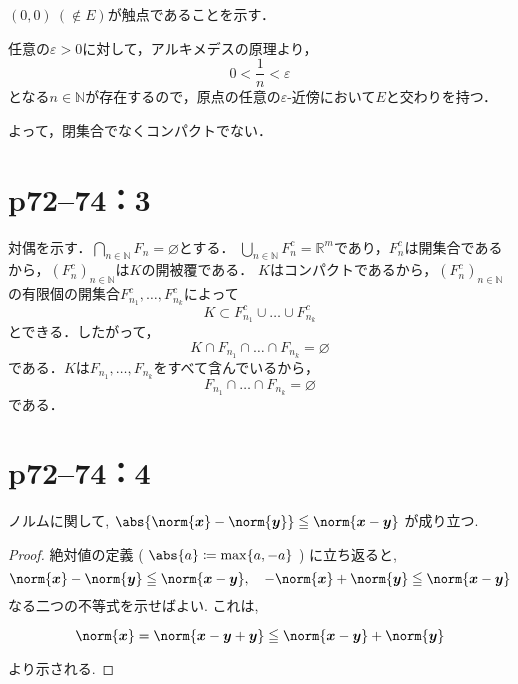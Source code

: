 \begin{tanswer}
    $(0,0)~(\notin E)$が触点であることを示す．

    任意の$\varepsilon >0$に対して，アルキメデスの原理より，
    \[
        0 < \frac{1}{n} < \varepsilon
    \]
    となる$n \in \mathbb{N}$が存在するので，原点の任意の$\varepsilon$-近傍において$E$と交わりを持つ．

    よって，閉集合でなくコンパクトでない．
\end{tanswer}



\section*{p72--74：3}
\begin{tproof}
    対偶を示す．$\bigcap_{n \in \mathbb{N}}F_n = \varnothing$とする．
    $\bigcup_{n \in \mathbb{N}}F_n^c = \mathbb{R}^m$であり，$F_n^c$は開集合であるから，$(F_n^c)_{n \in \mathbb{N}}$は$K$の開被覆である．
    $K$はコンパクトであるから，$(F_n^c)_{n \in \mathbb{N}}$の有限個の開集合$F_{n_1}^c,\ldots,F_{n_k}^c$によって
    \[
        K \subset F_{n_1}^c \cup \ldots \cup F_{n_k}^c
    \]
    とできる．したがって，
    \[
        K \cap F_{n_1} \cap \ldots \cap F_{n_k} = \varnothing
    \]
    である．$K$は$F_{n_1},\ldots,F_{n_k}$をすべて含んでいるから，
    \[
        F_{n_1} \cap \ldots \cap F_{n_k} = \varnothing
    \]
    である．
\end{tproof}



\section*{p72--74：4}

\begin{lemma}{}{}
    ノルムに関して, $\abs{\norm{ \bm{x}  }- \norm{ \bm{y} } } \leq \norm{ \bm{x} - \bm{y} }$ が成り立つ.
\end{lemma}

\begin{proof}
    絶対値の定義 ( $\abs{a} \coloneqq \max \{ a , -a \}$ ) に立ち返ると,
    \[
        \norm{ \bm{x}  }- \norm{ \bm{y} } \leq \norm{ \bm{x} - \bm{y} } ,\quad  - \norm{ \bm{x} } + \norm{ \bm{y} } \leq \norm{ \bm{x} - \bm{y} }
    \]
    なる二つの不等式を示せばよい. これは,

    \[
        \norm{ \bm{x} } = \norm{ \bm{x} - \bm{y} + \bm{y} } \leq \norm{ \bm x - \bm y } + \norm{ \bm{y} }
    \]

    より示される.
\end{proof}

